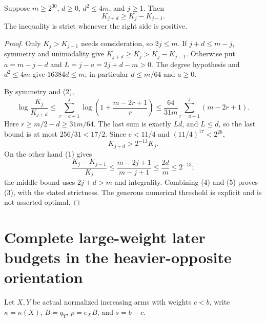 \begin{theorem}
Suppose $m\ge2^{30}$, $d\ge0$, $d^2\le4m$, and $j\ge1$.
Then
\[
                     K_{j+d}\ge K_j-K_{j-1}.          \tag{3}
\]
The inequality is strict whenever the right side is positive.
\end{theorem}
\begin{proof}
Only $K_j>K_{j-1}$ needs consideration, so $2j\le m$.
If $j+d\le m-j$, symmetry and unimodality give
$K_{j+d}\ge K_j>K_j-K_{j-1}$.
Otherwise put $a=m-j-d$ and $L=j-a=2j+d-m>0$.
The degree hypothesis and $d^2\le4m$ give $16384d\le m$;
in particular $d\le m/64$ and $a\ge0$.

By symmetry and (2),
\[
 \log\frac{K_j}{K_{j+d}}
 \le\sum_{r=a+1}^j\log\left(1+\frac{m-2r+1}{r}\right)
 \le\frac{64}{31m}\sum_{r=a+1}^j(m-2r+1).
\]
Here $r\ge m/2-d\ge31m/64$. The last sum is exactly $Ld$,
and $L\le d$, so the last bound is at most $256/31<17/2$.
Since $e<11/4$ and $(11/4)^{17}<2^{26}$,
\[
                         K_{j+d}>2^{-13}K_j.           \tag{4}
\]
On the other hand (1) gives
\[
 \frac{K_j-K_{j-1}}{K_j}
 \le\frac{m-2j+1}{m-j+1}
 \le\frac{2d}{m}\le2^{-13};                           \tag{5}
\]
the middle bound uses $2j+d>m$ and integrality.
Combining (4) and (5) proves (3), with the stated strictness.
The generous numerical threshold is explicit and is not asserted optimal.
\end{proof}

\section{Complete large-weight later budgets in the heavier-opposite orientation}
Let $X,Y$ be actual normalized increasing arms with weights $c<b$,
write $\kappa=\kappa(X)$, $B=q_Y$, $p=e_XB$, and $s=b-c$.

